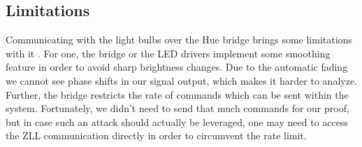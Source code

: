 \subsection{Limitations} %
\label{sec:exp:limitations}


Communicating with the light bulbs over the Hue bridge brings some limitations with it \cite{Ronen:2016:EFAIDCSL}. For one, the bridge or the LED drivers implement some smoothing feature in order to avoid sharp brightness changes. Due to the automatic fading we cannot see phase shifts in our signal output, which makes it harder to analyze. Further, the bridge restricts the rate of commands which can be sent within the system. Fortunately, we didn't need to send that much commands for our proof, but in case such an attack should actually be leveraged, one may need to access the ZLL communication directly in order to circumvent the rate limit.

